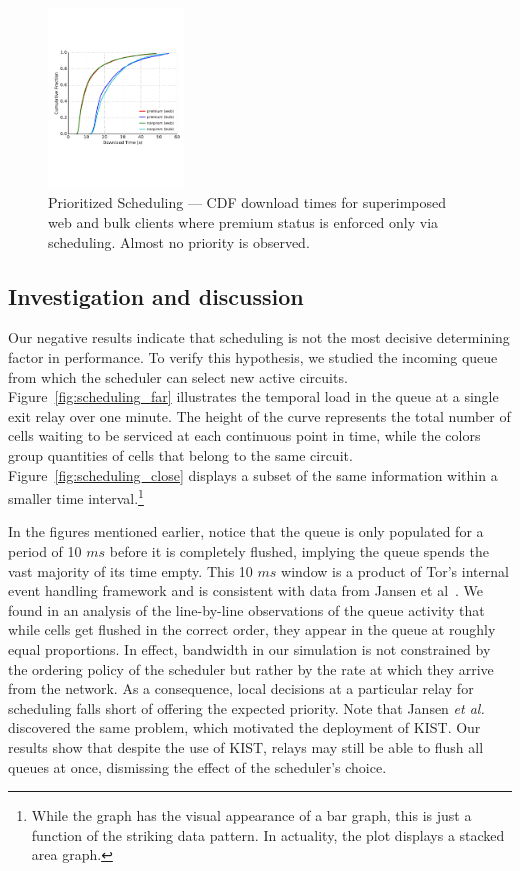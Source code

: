 \begin{figure} \centering
  \includegraphics[trim={0 3cm 0 3cm}, clip,
    width=0.32\textwidth]{images/scheduling_priority.pdf}
  \caption[Prioritized Scheduling]{Prioritized Scheduling --- CDF download times
    for superimposed web and bulk clients where premium status is enforced only
    via scheduling. Almost no priority is observed.}
  \label{fig:scheduling_priority}
\end{figure}

\subsection{Investigation and discussion}

Our negative results indicate that scheduling is not the most decisive determining factor in performance.
To verify this hypothesis, we studied the incoming queue from which the scheduler can select new active circuits.
Figure~\ref{fig:scheduling_far} illustrates the temporal load in the queue at a single exit relay over one minute.
The height of the curve represents the total number of cells waiting to be serviced at each continuous point in time, while the colors group quantities of cells that belong to the same circuit.
Figure~\ref{fig:scheduling_close} displays a subset of the same information within a smaller time interval.\footnote{While the graph has the visual appearance of a bar graph, this is just a function of the striking data pattern.
In actuality, the plot displays a stacked area graph.}

In the figures mentioned earlier, notice that the queue is only populated for a period of 10 $ms$ before it is completely flushed, implying the queue spends the vast majority of its time empty.
This 10 $ms$ window is a product of Tor's internal event handling framework and is consistent with data from Jansen et al~\cite{jansen2018kist}.
We found in an analysis of the line-by-line observations of the queue activity that while cells get flushed in the correct order, they appear in the queue at roughly equal proportions.
In effect, bandwidth in our simulation is not constrained by the ordering policy of the scheduler but rather by the rate at which they arrive from the network.
As a consequence, local decisions at a particular relay for scheduling falls short of offering the expected priority.
Note that Jansen \textit{et al.}~\cite{jansen2018kist} discovered the same problem, which motivated the deployment of KIST.
Our results show that despite the use of KIST, relays may still be able to flush all queues at once, dismissing the effect of the scheduler's choice.

